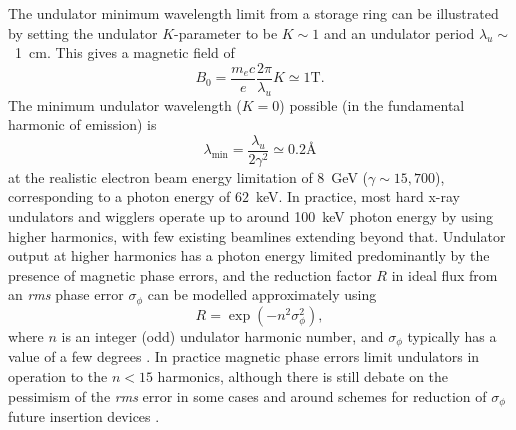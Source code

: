 \documentclass[../main.tex]{subfiles}
\begin{document}
The undulator minimum wavelength limit from a storage ring can be illustrated by setting the undulator $K$-parameter to be $K\sim 1$ and an undulator period $\lambda_u\sim$~1~\si{\centi\meter}. This gives a magnetic field of
\begin{equation}
B_{0} = \frac{m_{e} c}{e}\frac{2\pi}{\lambda_{u}} K \simeq 1\textrm{T}.
\label{eq:undulator_field_limit}
\end{equation}
The minimum undulator wavelength ($K=0$) possible (in the fundamental harmonic of emission) is
\begin{equation}
\lambda_\textrm{min} = \frac{\lambda_{u}}{2 \gamma^2} \simeq 0.2 \textrm{\AA}
\label{eq:undulator_minimum_wavelength}
\end{equation}
at the realistic electron beam energy limitation of 8~\si{\giga\electronvolt} ($\gamma \sim 15,700$), corresponding to a photon energy of $62$~\si{\kilo\electronvolt}. In practice, most hard x-ray undulators and wigglers operate up to around 100~\si{\kilo\electronvolt} photon energy by using higher harmonics, with few existing beamlines extending beyond that. Undulator output at higher harmonics has a photon energy limited predominantly by the presence of magnetic phase errors, and the reduction factor $R$ in ideal flux from an \textit{rms} phase error $\sigma_{\phi}$ can be modelled approximately \cite{walker1993interference} using 
\begin{equation}
R=\exp{\left(-n^2 \sigma_{\phi}^{2}\right)},
\label{eq:undulator_phase_errors}
\end{equation}
where $n$ is an integer (odd) undulator harmonic number, and $\sigma_\phi$ typically has a value of a few degrees \cite{walker2013phase}. In practice magnetic phase errors limit undulators in operation to the $n<15$ harmonics, although there is still debate on the pessimism of the \textit{rms} error in some cases \cite{tanaka2018universal} and around schemes for reduction of $\sigma_{\phi}$ future insertion devices \cite{hwang2011development,huang2017challenges}.
\end{document}
